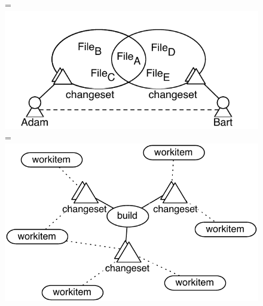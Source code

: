 \documentclass[12pt,oneside]{book}
\begin{document}
\begin{figure}
  =\hbox{\includegraphics{figures/cochangedfiles}}%
  =\hbox{\includegraphics{figures/buildworkitem}}%
	

\end{figure}
\end{document}
